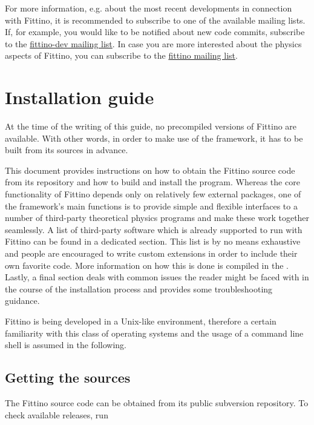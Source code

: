\documentclass[letterpaper,10pt,english]{sphinxmanual}
\begin{document}
For more information, e.g. about the most recent developments in connection with Fittino, it is
recommended to subscribe to one of the available mailing lists. If, for example, you would like to
be notified about new code commits, subscribe to the \href{https://lists.desy.de/sympa/subscribe/fittino-dev}{fittino-dev mailing list}. In case you are more interested about the
physics aspects of Fittino, you can subscribe to the \href{https://lists.desy.de/sympa/subscribe/fittino}{fittino mailing list}.


\chapter{Installation guide}
\label{installation_guide::doc}\label{installation_guide:installation-guide}\label{installation_guide:id1}
At the time of the writing of this guide, no precompiled versions of Fittino are available. With
other words, in order to make use of the framework, it has to be built from its sources in advance.

This document provides instructions on how to obtain the Fittino source code from its repository and
how to build and install the program. Whereas the core functionality of Fittino depends only on
relatively few external packages, one of the framework's main functions is to provide simple and
flexible interfaces to a number of third-party theoretical physics programs and make these work
together seamlessly. A list of third-party software which is already supported to run with Fittino
can be found in a dedicated section. This list is by no means exhaustive and people are encouraged
to write custom extensions in order to include their own favorite code. More information on how this
is done is compiled in the . Lastly, a final section deals with common issues
the reader might be faced with in the course of the installation process and provides some
troubleshooting guidance.

Fittino is being developed in a Unix-like environment, therefore a certain familiarity with this
class of operating systems and the usage of a command line shell is assumed in the following.


\section{Getting the sources}
\label{source_code:getting-the-sources}\label{source_code::doc}
The Fittino source code can be obtained from its public subversion repository. To check available
releases, run
\end{document}
